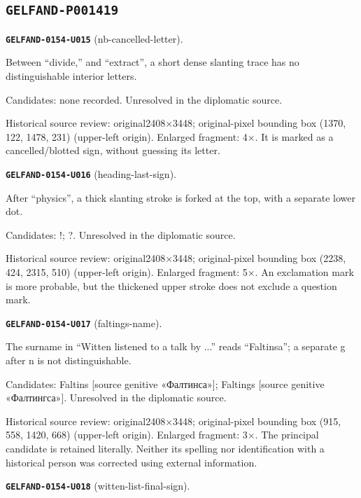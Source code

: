 \subsection*{\texttt{GELFAND-P001419}}
\par\noindent\leavevmode{}\label{GELFAND-0154-U015}\textbf{\texttt{GELFAND-0154-U015}} (nb-cancelled-letter).\nopagebreak[4]\par
Between “divide,” and “extract”, a short dense slanting trace has no distinguishable interior letters.\par
Candidates: none recorded. Unresolved in the diplomatic source.\par
Historical source review: original2408×3448; original-pixel bounding box (1370, 122, 1478, 231) (upper-left origin). Enlarged fragment: 4×. It is marked as a cancelled/blotted sign, without guessing its letter.\par\medskip
\par\noindent\leavevmode{}\label{GELFAND-0154-U016}\textbf{\texttt{GELFAND-0154-U016}} (heading-last-sign).\nopagebreak[4]\par
After “physics”, a thick slanting stroke is forked at the top, with a separate lower dot.\par
Candidates: !; ?. Unresolved in the diplomatic source.\par
Historical source review: original2408×3448; original-pixel bounding box (2238, 424, 2315, 510) (upper-left origin). Enlarged fragment: 5×. An exclamation mark is more probable, but the thickened upper stroke does not exclude a question mark.\par\medskip
\par\noindent\leavevmode{}\label{GELFAND-0154-U017}\textbf{\texttt{GELFAND-0154-U017}} (faltings-name).\nopagebreak[4]\par
The surname in “Witten listened to a talk by ...” reads “Faltinsa”; a separate g after n is not distinguishable.\par
Candidates: Faltins [source genitive «Фалтинса»]; Faltings [source genitive «Фалтингса»]. Unresolved in the diplomatic source.\par
Historical source review: original2408×3448; original-pixel bounding box (915, 558, 1420, 668) (upper-left origin). Enlarged fragment: 3×. The principal candidate is retained literally. Neither its spelling nor identification with a historical person was corrected using external information.\par\medskip
\par\noindent\leavevmode{}\label{GELFAND-0154-U018}\textbf{\texttt{GELFAND-0154-U018}} (witten-list-final-sign).\nopagebreak[4]\par
